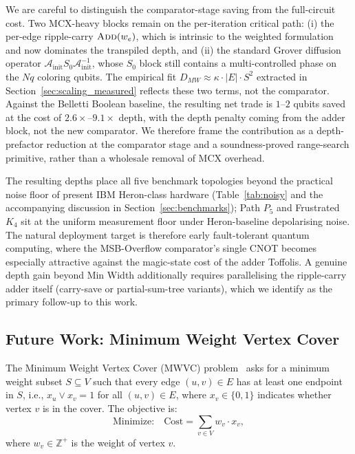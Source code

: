 \documentclass{ieeeaccess}
\begin{document}
We are careful to distinguish the comparator-stage saving from the full-circuit cost. Two MCX-heavy blocks remain on the per-iteration critical path: (i) the per-edge ripple-carry $\textsc{Add}(w_e)$, which is intrinsic to the weighted formulation and now dominates the transpiled depth, and (ii) the standard Grover diffusion operator $\mathcal{A}_\mathrm{init} S_0 \mathcal{A}_\mathrm{init}^{-1}$, whose $S_0$ block still contains a multi-controlled phase on the $N q$ coloring qubits. The empirical fit $D_{MW} \approx \kappa \cdot |E| \cdot S^2$ extracted in Section~\ref{sec:scaling_measured} reflects these two terms, not the comparator. Against the Belletti Boolean baseline, the resulting net trade is $1$--$2$ qubits saved at the cost of $2.6\times$--$9.1\times$ depth, with the depth penalty coming from the adder block, not the new comparator. We therefore frame the contribution as a depth-prefactor reduction at the comparator stage and a soundness-proved range-search primitive, rather than a wholesale removal of MCX overhead.

The resulting depths place all five benchmark topologies beyond the practical noise floor of present IBM Heron-class hardware (Table~\ref{tab:noisy} and the accompanying discussion in Section~\ref{sec:benchmarks}); Path $P_5$ and Frustrated $K_4$ sit at the uniform measurement floor under Heron-baseline depolarising noise. The natural deployment target is therefore early fault-tolerant quantum computing, where the MSB-Overflow comparator's single CNOT becomes especially attractive against the magic-state cost of the adder Toffolis. A genuine depth gain beyond Min Width additionally requires parallelising the ripple-carry adder itself (carry-save or partial-sum-tree variants), which we identify as the primary follow-up to this work.

\subsection{Future Work: Minimum Weight Vertex Cover}

The Minimum Weight Vertex Cover (MWVC) problem~\cite{garey1979,west2001} asks
for a minimum weight subset $S \subseteq V$ such that every edge
$(u,v) \in E$ has at least one endpoint in $S$, i.e.,
$x_u \vee x_v = 1$ for all $(u,v) \in E$, where $x_v \in \{0,1\}$
indicates whether vertex $v$ is in the cover. The objective is:
%
\begin{equation}
  \text{Minimize:}\quad
  \text{Cost} = \sum_{v \in V} w_v \cdot x_v,
  \label{eq:mwvc_obj}
\end{equation}
%
where $w_v \in \mathbb{Z}^+$ is the weight of vertex $v$.
\end{document}
